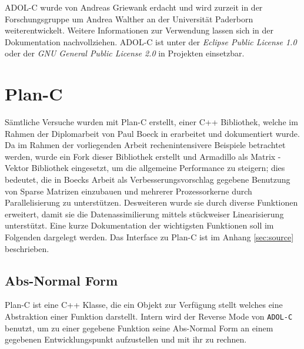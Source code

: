 ADOL-C wurde von Andreas Griewank erdacht und wird zurzeit in der Forschungsgruppe um Andrea Walther an der Universität Paderborn weiterentwickelt. Weitere Informationen zur Verwendung lassen sich in der Dokumentation \cite{walther2012getting} nachvollziehen. ADOL-C ist unter der \textit{Eclipse Public License 1.0} oder der \textit{GNU General Public License 2.0} in Projekten einsetzbar.

\section{Plan-C}
\label{sec:impl:planc}
Sämtliche Versuche wurden mit Plan-C erstellt, einer C++ Bibliothek, welche im Rahmen der Diplomarbeit von Paul Boeck in \cite{boeck14} erarbeitet und dokumentiert wurde. Da im Rahmen der vorliegenden Arbeit rechenintensivere Beispiele betrachtet werden, wurde ein Fork dieser Bibliothek erstellt und Armadillo als Matrix - Vektor Bibliothek eingesetzt, um die allgemeine Performance zu steigern; dies bedeutet, die in Boecks Arbeit als Verbesserungsvorschlag gegebene Benutzung von Sparse Matrizen einzubauen und mehrerer Prozessorkerne durch Parallelisierung zu unterstützen.  Desweiteren wurde sie durch diverse Funktionen erweitert, damit sie die Datenassimilierung mittels stückweiser Linearisierung unterstützt. Eine kurze Dokumentation der wichtigsten Funktionen soll im Folgenden dargelegt werden. Das Interface zu Plan-C ist im Anhang \ref{sec:source} beschrieben.

\subsection{Abs-Normal Form}
Plan-C ist eine C++ Klasse, die ein Objekt zur Verfügung stellt welches eine Abstraktion einer Funktion darstellt. Intern wird der Reverse Mode von \texttt{ADOL-C} benutzt, um zu einer gegebene Funktion seine Abs-Normal Form an einem gegebenen Entwicklungspunkt aufzustellen und mit ihr zu rechnen.

